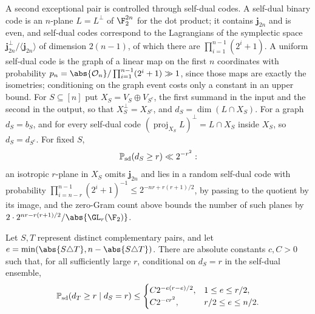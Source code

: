 A second exceptional pair is controlled through self-dual codes. A self-dual binary code is an
$n$-plane $L=L^\perp$ of $\F_2^{2n}$ for the dot product; it contains $\mathbf j_{2n}$ and is even,
and self-dual codes correspond to the Lagrangians of the symplectic space
$\mathbf j_{2n}^\perp/\langle\mathbf j_{2n}\rangle$ of dimension $2(n-1)$, of which there are
$\prod_{i=1}^{n-1}(2^i+1)$. A uniform self-dual code is the graph of a linear map on the first
$n$ coordinates with probability $p_n=\abs{\spnOrth_n}/\prod_{i=1}^{n-1}(2^i+1)\gg1$, since those
maps are exactly the isometries; conditioning on the graph event costs only a constant in an
upper bound. For $S\subseteq[n]$ put $X_S=V_S\oplus V_{S^c}$, the first summand in the input and
the second in the output, so that $X_S^\perp=X_{S^c}$, and $d_S=\dim(L\cap X_S)$. For a graph
$d_S=b_S$, and for every self-dual code $(\operatorname{proj}_{X_S}L)^{\perp}=L\cap X_S$ inside
$X_S$, so $d_S=d_{S^c}$. For fixed $S$,
\begin{equation}\label{spn:eq:sdone}
 \mathbb{P}_{\mathrm{sd}}(d_S\ge r)\ll2^{-r^2}:
\end{equation}
an isotropic $r$-plane in $X_S$ omits $\mathbf j_{2n}$ and lies in a random self-dual code with
probability $\prod_{i=n-r}^{n-1}(2^i+1)^{-1}\le2^{-nr+r(r+1)/2}$, by passing to the quotient by
its image, and the zero-Gram count above bounds the number of such planes by
$2\cdot2^{nr-r(r+1)/2}/\abs{\GL_r(\F_2)}$.

\begin{lemma}\label{spn:lem:twopairs}
Let $S,T$ represent distinct complementary pairs, and let
$e=\min(\abs{S\triangle T},n-\abs{S\triangle T})$. There are absolute constants $c,C>0$ such
that, for all sufficiently large $r$, conditional on $d_S=r$ in the self-dual ensemble,
\[
 \mathbb{P}_{\mathrm{sd}}(d_T\ge r\mid d_S=r)\le
 \begin{cases}C2^{-e(r-e)/2},&1\le e\le r/2,\\ C2^{-cr^2},&r/2\le e\le n/2.\end{cases}
\]
\end{lemma}

